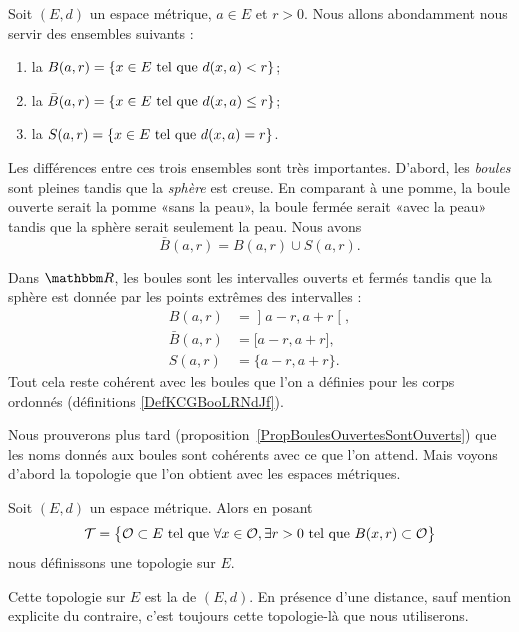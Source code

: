 \begin{definition}  \label{EQooYCWSooIhibvd}
	Soit \((E,d)\) un espace métrique, $a\in E$ et $r>0$. Nous allons abondamment nous servir des ensembles suivants :
	\begin{enumerate}
		\item
			la  $B(a,r)=\{ x\in E\text{ tel que } d(x,a)<r \}$;
		\item
			la  $\bar B(a,r)=\{ x\in E\text{ tel que } d(x,a)\leq r \}$;
		\item
			la  $S(a,r)=\{ x\in E\text{ tel que } d(x,a)=r \}$.

	\end{enumerate}
\end{definition}
Les différences entre ces trois ensembles sont très importantes. D'abord, les \emph{boules} sont pleines tandis que la \emph{sphère} est creuse. En comparant à une pomme, la boule ouverte serait la pomme «sans la peau», la boule fermée serait «avec la peau» tandis que la sphère serait seulement la peau. Nous avons
\begin{equation}
	\bar B(a,r)=B(a,r)\cup S(a,r).
\end{equation}

\begin{example}
  Dans $\eR$, les boules sont les intervalles ouverts et fermés tandis que la sphère est donnée par les points extrêmes des intervalles :
	\begin{equation}
		\begin{aligned}
			B(a,r)&=\mathopen] a-r , a+r \mathclose[,\\
			\bar B(a,r)&=\mathopen[ a-r , a+r \mathclose],\\
			S(a,r)&=\{ a-r,a+r \}.
		\end{aligned}
	\end{equation}
        Tout cela reste cohérent avec les boules que l'on a définies pour les corps ordonnés (définitions \ref{DefKCGBooLRNdJf}).
\end{example}
Nous prouverons plus tard (proposition~\ref{PropBoulesOuvertesSontOuverts}) que les noms donnés aux boules sont cohérents avec ce que l'on attend. Mais voyons d'abord la topologie que l'on obtient avec les espaces métriques.
\begin{theoremDef}     \label{ThoORdLYUu}
    Soit \( (E,d)\) un espace métrique. Alors en posant
    \begin{equation}        \label{EqGDVVooDZfwSf}
        \mathcal{T}=\big\{  \mathcal{O}\subset E  \text{ tel que }\forall x\in \mathcal{O},\exists r>0\text{ tel que } B(x,r)\subset \mathcal{O} \big\}
    \end{equation}
    nous définissons une topologie sur \( E\).

    Cette topologie sur \( E\) est la  de \( (E,d)\). En présence d'une distance, sauf mention explicite du contraire, c'est toujours cette topologie-là que nous utiliserons.
\end{theoremDef}

